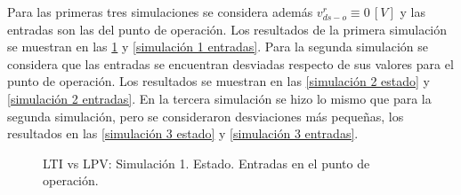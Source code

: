 \documentclass[a4paper, 10pt, onecolumn,journal]{ieeeconf}
\begin{document}
Para las primeras tres simulaciones se considera además  $v^r_{ds-o}\equiv 0 \,\left[V\right]$ y las entradas son las del punto de operación.
Los resultados de la primera simulación se muestran en las \cref{simulación 1 estado} y \cref{simulación 1 entradas}.
Para la segunda simulación se considera que las entradas se encuentran desviadas respecto de sus valores para el punto de operación. Los resultados se muestran
en las \cref{simulación 2 estado} y \cref{simulación 2 entradas}. En la tercera simulación se hizo lo mismo que para la segunda simulación, pero se consideraron desviaciones más
pequeñas, los resultados en las \cref{simulación 3 estado} y \cref{simulación 3 entradas}.



\begin{figure}[H]
	\centering
	\begin{adjustbox}{max width=\columnwidth}
	\end{adjustbox}
	\caption{LTI vs LPV: Simulación 1. Estado. Entradas en el punto de operación.}
	\label{simulación 1 estado}
\end{figure}
\end{document}
